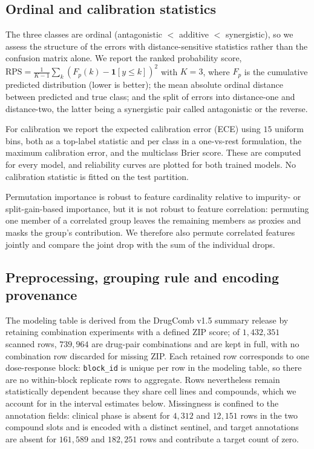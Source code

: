 \documentclass[11pt]{article}
\begin{document}
\subsection{Ordinal and calibration statistics}
The three classes are ordinal (antagonistic $<$ additive $<$ synergistic), so we assess the structure
of the errors with distance-sensitive statistics rather than the confusion matrix alone. We report the
ranked probability score, $\mathrm{RPS} = \frac{1}{K-1}\sum_{k}\left(F_{p}(k) - \mathbf{1}[y \leq
k]\right)^{2}$ with $K=3$, where $F_p$ is the cumulative predicted distribution (lower is better); the
mean absolute ordinal distance between predicted and true class; and the split of errors into
distance-one and distance-two, the latter being a synergistic pair called antagonistic or the reverse.

For calibration we report the expected calibration error (ECE) using $15$ uniform bins, both as a
top-label statistic and per class in a one-vs-rest formulation, the maximum calibration error, and the
multiclass Brier score. These are computed for every model, and reliability curves are plotted for both
trained models. No calibration statistic is fitted on the test partition.

Permutation importance is robust to feature cardinality relative to impurity- or split-gain-based
importance, but it is not robust to feature correlation: permuting one member of a correlated group
leaves the remaining members as proxies and masks the group's contribution. We therefore also permute
correlated features jointly and compare the joint drop with the sum of the individual drops.

\subsection{Preprocessing, grouping rule and encoding provenance}
The modeling table is derived from the DrugComb v1.5 summary release by retaining combination
experiments with a defined ZIP score; of $1{,}432{,}351$ scanned rows, $739{,}964$ are drug-pair
combinations and are kept in full, with no combination row discarded for missing ZIP. Each retained row
corresponds to one dose-response block: \texttt{block\_id} is unique per row in the modeling table, so
there are no within-block replicate rows to aggregate. Rows nevertheless remain statistically dependent
because they share cell lines and compounds, which we account for in the interval estimates below.
Missingness is confined to the annotation fields: clinical phase is absent for $4{,}312$ and $12{,}151$
rows in the two compound slots and is encoded with a distinct sentinel, and target annotations are
absent for $161{,}589$ and $182{,}251$ rows and contribute a target count of zero.
\end{document}
